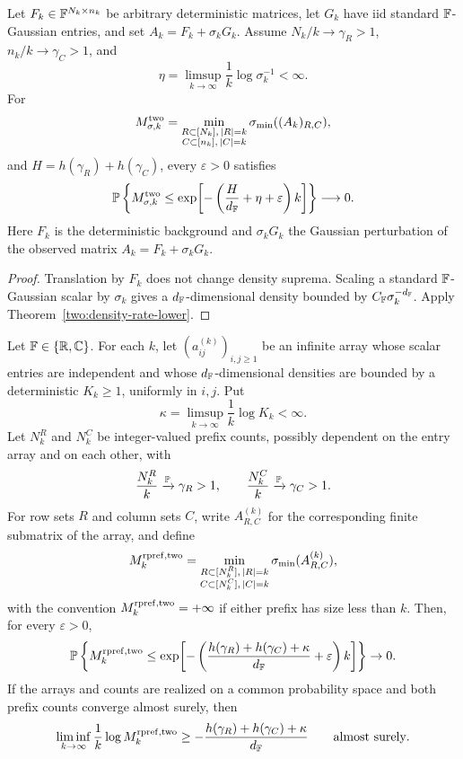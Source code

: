 \begin{corollary}\label{two:smoothed-lower}
Let \(F_k\in\mathbb{F}^{N_k\times n_k}\) be arbitrary deterministic matrices, let
\(G_k\) have iid standard \(\mathbb{F}\)-Gaussian entries, and set
\(A_k=F_k+\sigma_kG_k\).  Assume \(N_k/k\to\gamma_R>1\),
\(n_k/k\to\gamma_C>1\), and
\[
  \eta=\limsup_{k\to\infty}\frac1k\log\sigma_k^{-1}<\infty .
\]
For
\[
  M_{\sigma,k}^{\rm two}
  =\min_{\substack{R\subset[N_k],\, |R|=k\\ C\subset[n_k],\, |C|=k}}
    \sigma_{\min}((A_k)_{R,C}),
\]
and \(H=h(\gamma_R)+h(\gamma_C)\), every \(\varepsilon>0\) satisfies
\[
  \mathbb{P}\left\{M_{\sigma,k}^{\rm two}\le
  \exp\!\left[-\left(\frac{H}{d_{\mathbb{F}}}+\eta+\varepsilon\right)k\right]\right\}
  \longrightarrow0.
\]
Here \(F_k\) is the deterministic background and \(\sigma_kG_k\) the Gaussian
perturbation of the observed matrix \(A_k=F_k+\sigma_kG_k\).
\end{corollary}

\begin{proof}
Translation by \(F_k\) does not change density suprema.  Scaling a standard
\(\mathbb{F}\)-Gaussian scalar by \(\sigma_k\) gives a \(d_{\mathbb{F}}\)-dimensional density
bounded by \(C_{\mathbb{F}}\sigma_k^{-d_{\mathbb{F}}}\).  Apply
Theorem~\ref{two:density-rate-lower}.
\end{proof}

\begin{corollary}\label{two:random-prefix-density-rate-lower}
Let \(\mathbb{F}\in\{\mathbb{R},\mathbb{C}\}\).  For each \(k\), let
\((a_{ij}^{(k)})_{i,j\ge1}\) be an infinite array whose scalar entries are
independent and whose \(d_{\mathbb{F}}\)-dimensional densities are bounded by a
deterministic \(K_k\ge1\), uniformly in \(i,j\).  Put
\[
  \kappa=\limsup_{k\to\infty}\frac1k\log K_k<\infty .
\]
Let \(N_k^{R}\) and \(N_k^{C}\) be integer-valued prefix counts, possibly
dependent on the entry array and on each other, with
\[
  \frac{N_k^{R}}k\xrightarrow{\mathbb{P}}\gamma_R>1,\qquad
  \frac{N_k^{C}}k\xrightarrow{\mathbb{P}}\gamma_C>1 .
\]
For row sets \(R\) and column sets \(C\), write \(A_{R,C}^{(k)}\) for the
corresponding finite submatrix of the array, and define
\[
  M_k^{\rm rpref,two}
  =
  \min_{\substack{R\subset[N_k^{R}],\, |R|=k\\
                  C\subset[N_k^{C}],\, |C|=k}}
  \sigma_{\min}(A_{R,C}^{(k)}),
\]
with the convention \(M_k^{\rm rpref,two}=+\infty\) if either prefix has size
less than \(k\).  Then, for every \(\varepsilon>0\),
\[
  \mathbb{P}\left\{
  M_k^{\rm rpref,two}\le
  \exp\!\left[-\left(
  \frac{h(\gamma_R)+h(\gamma_C)+\kappa}{d_{\mathbb{F}}}+\varepsilon
  \right)k\right]\right\}\to0.
\]
If the arrays and counts are realized on a common probability space and both
prefix counts converge almost surely, then
\[
  \liminf_{k\to\infty}\frac1k\log M_k^{\rm rpref,two}
  \ge
  -\frac{h(\gamma_R)+h(\gamma_C)+\kappa}{d_{\mathbb{F}}}
  \qquad\hbox{almost surely}.
\]
\end{corollary}

